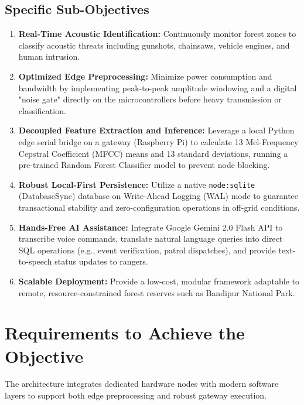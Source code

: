 \documentclass[11pt,a4paper]{article}
\begin{document}
\subsection{Specific Sub-Objectives}
\begin{enumerate}
    \item \textbf{Real-Time Acoustic Identification:} Continuously monitor forest zones to classify acoustic threats including gunshots, chainsaws, vehicle engines, and human intrusion.
    \item \textbf{Optimized Edge Preprocessing:} Minimize power consumption and bandwidth by implementing peak-to-peak amplitude windowing and a digital "noise gate" directly on the microcontrollers before heavy transmission or classification.
    \item \textbf{Decoupled Feature Extraction and Inference:} Leverage a local Python edge serial bridge on a gateway (Raspberry Pi) to calculate 13 Mel-Frequency Cepstral Coefficient (MFCC) means and 13 standard deviations, running a pre-trained Random Forest Classifier model to prevent node blocking.
    \item \textbf{Robust Local-First Persistence:} Utilize a native \texttt{node:sqlite} (DatabaseSync) database on Write-Ahead Logging (WAL) mode to guarantee transactional stability and zero-configuration operations in off-grid conditions.
    \item \textbf{Hands-Free AI Assistance:} Integrate Google Gemini 2.0 Flash API to transcribe voice commands, translate natural language queries into direct SQL operations (e.g., event verification, patrol dispatches), and provide text-to-speech status updates to rangers.
    \item \textbf{Scalable Deployment:} Provide a low-cost, modular framework adaptable to remote, resource-constrained forest reserves such as Bandipur National Park.
\end{enumerate}

\section{Requirements to Achieve the Objective}
The architecture integrates dedicated hardware nodes with modern software layers to support both edge preprocessing and robust gateway execution.
\end{document}
